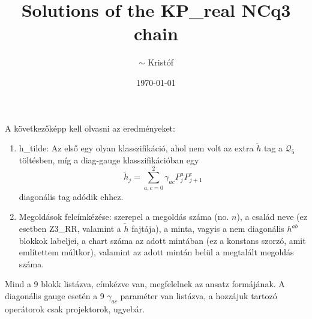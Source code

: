 \documentclass[a4paper, 11pt, twoside, onecolumn]{article}
\title{\Large{Solutions of the KP\_real NCq3 chain}}
\author{$\sim$ Kristóf}
\date{\today}
\newcommand{\qot}{\mathcal{Q}_5}
\newcommand{\htil}{\tilde{h}}
\begin{document}
\maketitle
\tableofcontents
\vspace{2cm}
A következőképp kell olvasni az eredményeket:
\begin{enumerate}
	\item h_tilde: Az első egy olyan klasszifikáció, ahol nem volt az extra $\htil$ tag a $\qot$ töltésben, míg a diag-gauge klasszifikációban egy 
	\begin{equation}
		\htil_j = \sum_{a,c=0}^2\gamma_{ac}P_j^aP_{j+1}^c
	\end{equation}
	diagonális tag adódik ehhez.
	\item Megoldások felcímkézése: szerepel a megoldás száma (no. $n$), a család neve (ez esetben Z3_RR, valamint a $\htil$ fajtája), a minta, vagyis a nem diagonális $h^{ab}$ blokkok labeljei, a chart száma az adott mintában (ez a konstans szorzó, amit említettem múltkor), valamint az adott mintán belül a megtalált megoldás száma.
\end{enumerate}
Mind a 9 blokk listázva, címkézve van, megfelelnek az ansatz formájának. A diagonális gauge esetén a 9 $\gamma_{ac}$ paraméter van listázva, a hozzájuk tartozó operátorok csak projektorok, ugyebár.
\end{document}
